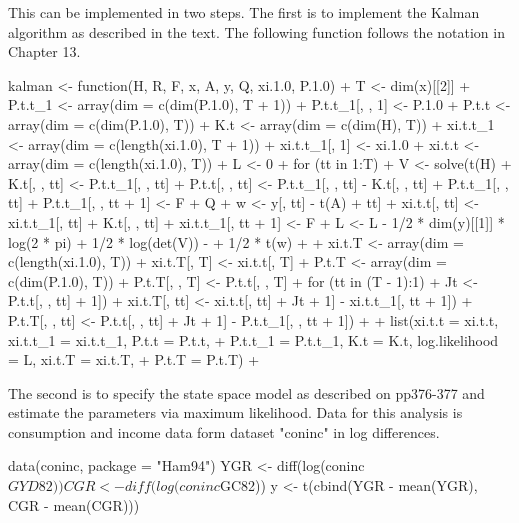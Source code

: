 \documentclass[a4paper]{article}
\renewcommand{\~}{\perispomeni}%
\begin{document}
This can be implemented in two steps.  The first is to implement the Kalman algorithm as described in the text.  The
following function follows the notation in Chapter 13.
\begin{Schunk}
\begin{Sinput}
 kalman <- function(H, R, F, x, A, y, Q, xi.1.0, P.1.0) {
+     T <- dim(x)[[2]]
+     P.t.t_1 <- array(dim = c(dim(P.1.0), T + 1))
+     P.t.t_1[, , 1] <- P.1.0
+     P.t.t <- array(dim = c(dim(P.1.0), T))
+     K.t <- array(dim = c(dim(H), T))
+     xi.t.t_1 <- array(dim = c(length(xi.1.0), T + 1))
+     xi.t.t_1[, 1] <- xi.1.0
+     xi.t.t <- array(dim = c(length(xi.1.0), T))
+     L <- 0
+     for (tt in 1:T) {
+         V <- solve(t(H) %
+         K.t[, , tt] <- P.t.t_1[, , tt] %
+         P.t.t[, , tt] <- P.t.t_1[, , tt] - K.t[, , tt] %
+             P.t.t_1[, , tt]
+         P.t.t_1[, , tt + 1] <- F %
+             Q
+         w <- y[, tt] - t(A) %
+             tt]
+         xi.t.t[, tt] <- xi.t.t_1[, tt] + K.t[, , tt] %
+         xi.t.t_1[, tt + 1] <- F %
+         L <- L - 1/2 * dim(y)[[1]] * log(2 * pi) + 1/2 * log(det(V)) - 
+             1/2 * t(w) %
+     }
+     xi.t.T <- array(dim = c(length(xi.1.0), T))
+     xi.t.T[, T] <- xi.t.t[, T]
+     P.t.T <- array(dim = c(dim(P.1.0), T))
+     P.t.T[, , T] <- P.t.t[, , T]
+     for (tt in (T - 1):1) {
+         Jt <- P.t.t[, , tt] %
+             1])
+         xi.t.T[, tt] <- xi.t.t[, tt] + Jt %
+             1] - xi.t.t_1[, tt + 1])
+         P.t.T[, , tt] <- P.t.t[, , tt] + Jt %
+             1] - P.t.t_1[, , tt + 1]) %
+     }
+     list(xi.t.t = xi.t.t, xi.t.t_1 = xi.t.t_1, P.t.t = P.t.t, 
+         P.t.t_1 = P.t.t_1, K.t = K.t, log.likelihood = L, xi.t.T = xi.t.T, 
+         P.t.T = P.t.T)
+ }
\end{Sinput}
\end{Schunk}
The second is to specify the state space model as described on pp376-377 and estimate the parameters
via maximum likelihood.  Data for this analysis is consumption and income data form dataset "coninc" in log differences.
\begin{Schunk}
\begin{Sinput}
 data(coninc, package = "Ham94")
 YGR <- diff(log(coninc$GYD82))
 CGR <- diff(log(coninc$GC82))
 y <- t(cbind(YGR - mean(YGR), CGR - mean(CGR)))
\end{Sinput}
\end{Schunk}
\end{document}
